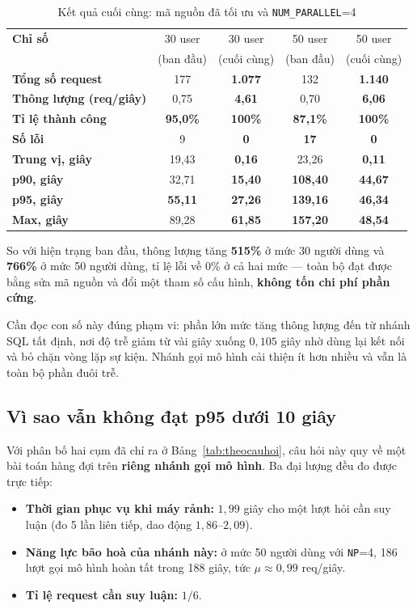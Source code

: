 \documentclass[12pt,a4paper]{article}
\newcommand{\ok}[1]{\textcolor{successgreen}{\bfseries #1}}
\newcommand{\warn}[1]{\textcolor{warnorange}{\bfseries #1}}
\newcommand{\bad}[1]{\textcolor{dangerred}{\bfseries #1}}
\begin{document}
\begin{table}[H]
\centering
\caption{Kết quả cuối cùng: mã nguồn đã tối ưu và \texttt{NUM\_PARALLEL}=4}
\label{tab:cuoicung}
\begin{tabularx}{\textwidth}{>{\bfseries}Xcccc}
\toprule
\rowcolor{lightblue}
Chỉ số & 30 user & 30 user & 50 user & 50 user\\
\rowcolor{lightblue}
 & (ban đầu) & (cuối cùng) & (ban đầu) & (cuối cùng)\\
\midrule
Tổng số request   & 177 & \ok{1.077} & 132 & \ok{1.140}\\
Thông lượng (req/giây) & 0,75 & \ok{4,61} & 0,70 & \ok{6,06}\\
Tỉ lệ thành công  & \warn{95,0\%} & \ok{100\%} & \warn{87,1\%} & \ok{100\%}\\
Số lỗi            & 9 & \ok{0} & \bad{17} & \ok{0}\\
Trung vị, giây    & 19,43 & \ok{0,16} & 23,26 & \ok{0,11}\\
p90, giây         & 32,71 & \ok{15,40} & \bad{108,40} & \ok{44,67}\\
p95, giây         & \bad{55,11} & \ok{27,26} & \bad{139,16} & \ok{46,34}\\
Max, giây         & 89,28 & \ok{61,85} & \bad{157,20} & \ok{48,54}\\
\bottomrule
\end{tabularx}
\end{table}

So với hiện trạng ban đầu, thông lượng tăng \textbf{515\%} ở mức 30 người dùng và
\textbf{766\%} ở mức 50 người dùng, tỉ lệ lỗi về 0\% ở cả hai mức --- toàn bộ đạt
được bằng sửa mã nguồn và đổi một tham số cấu hình, \textbf{không tốn chi phí phần
cứng}.

Cần đọc con số này đúng phạm vi: phần lớn mức tăng thông lượng đến từ nhánh SQL
tất định, nơi độ trễ giảm từ vài giây xuống $0{,}105$ giây nhờ dùng lại kết nối và
bỏ chặn vòng lặp sự kiện. Nhánh gọi mô hình cải thiện ít hơn nhiều và vẫn là toàn
bộ phần đuôi trễ.

\subsection{Vì sao vẫn không đạt p95 dưới 10 giây}
\label{sec:p95}

Với phân bố hai cụm đã chỉ ra ở Bảng~\ref{tab:theocauhoi}, câu hỏi này quy về một
bài toán hàng đợi trên \textbf{riêng nhánh gọi mô hình}. Ba đại lượng đều đo được
trực tiếp:

\begin{itemize}
  \item \textbf{Thời gian phục vụ khi máy rảnh:} $1{,}99$ giây cho một lượt hỏi
  cần suy luận (đo 5 lần liên tiếp, dao động $1{,}86$--$2{,}09$).
  \item \textbf{Năng lực bão hoà của nhánh này:} ở mức 50 người dùng với
  \texttt{NP}=4, 186 lượt gọi mô hình hoàn tất trong 188 giây, tức
  $\mu \approx 0{,}99$ req/giây.
  \item \textbf{Tỉ lệ request cần suy luận:} $1/6$.
\end{itemize}
\end{document}

